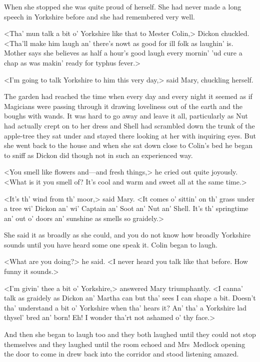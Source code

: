 When she stopped she was quite proud of herself. She had never made a long speech in Yorkshire before and she had remembered very well.

<Tha' mun talk a bit o' Yorkshire like that to Mester Colin,> Dickon chuckled. <Tha'll make him laugh an' there's nowt as good for ill folk as laughin' is. Mother says she believes as half a hour's good laugh every mornin' 'ud cure a chap as was makin' ready for typhus fever.>

<I'm going to talk Yorkshire to him this very day,> said Mary, chuckling herself.

The garden had reached the time when every day and every night it seemed as if Magicians were passing through it drawing loveliness out of the earth and the boughs with wands. It was hard to go away and leave it all, particularly as Nut had actually crept on to her dress and Shell had scrambled down the trunk of the apple-tree they sat under and stayed there looking at her with inquiring eyes. But she went back to the house and when she sat down close to Colin's bed he began to sniff as Dickon did though not in such an experienced way.

<You smell like flowers and—and fresh things,> he cried out quite joyously. <What is it you smell of? It's cool and warm and sweet all at the same time.>

<It's th' wind from th' moor,> said Mary. <It comes o' sittin' on th' grass under a tree wi' Dickon an' wi' Captain an' Soot an' Nut an' Shell. It's th' springtime an' out o' doors an' sunshine as smells so graidely.>

She said it as broadly as she could, and you do not know how broadly Yorkshire sounds until you have heard some one speak it. Colin began to laugh.

<What are you doing?> he said. <I never heard you talk like that before. How funny it sounds.>

<I'm givin' thee a bit o' Yorkshire,> answered Mary triumphantly. <I canna' talk as graidely as Dickon an' Martha can but tha' sees I can shape a bit. Doesn't tha' understand a bit o' Yorkshire when tha' hears it? An' tha' a Yorkshire lad thysel' bred an' born! Eh! I wonder tha'rt not ashamed o' thy face.>

And then she began to laugh too and they both laughed until they could not stop themselves and they laughed until the room echoed and Mrs~Medlock opening the door to come in drew back into the corridor and stood listening amazed.

